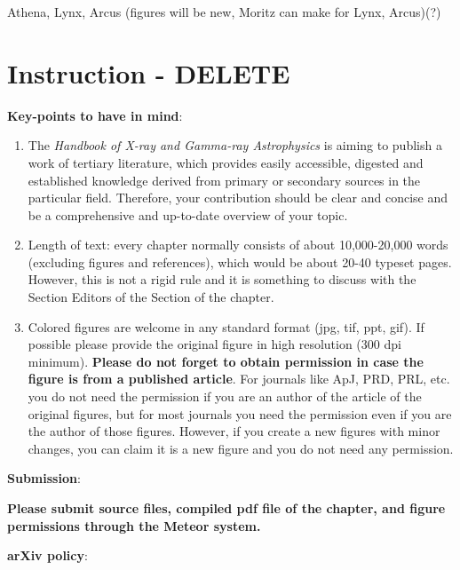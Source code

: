 \documentclass[graybox, nosecnum]{svmult}
\begin{document}
Athena, Lynx, Arcus (figures will be new, Moritz can make for Lynx, Arcus)(?)



\section{Instruction - DELETE}

\vspace{0.3cm}

{\bf Key-points to have in mind}:
\begin{enumerate}
\item The {\it Handbook of X-ray and Gamma-ray Astrophysics} is aiming to publish a work of tertiary literature, which provides easily accessible, digested and established knowledge derived from primary or secondary sources in the particular field. Therefore, your contribution should be clear and concise and be a comprehensive and up-to-date overview of your topic.
\item Length of text: every chapter normally consists of about 10,000-20,000 words (excluding figures and references), which would be about 20-40 typeset pages. However, this is not a rigid rule and it is something to discuss with the Section Editors of the Section of the chapter.
\item Colored figures are welcome in any standard format (jpg, tif, ppt, gif). If possible please provide the original figure in high resolution (300 dpi minimum). {\color{red}\bf Please do not forget to obtain permission in case the figure is from a published article}. For journals like ApJ, PRD, PRL, etc. you do not need the permission if you are an author of the article of the original figures, but for most journals you need the permission even if you are the author of those figures. However, if you create a new figures with minor changes, you can claim it is a new figure and you do not need any permission.
\end{enumerate}


\vspace{0.5cm}

{\bf Submission}:

\vspace{0.1cm}

{\color{red} \bf Please submit source files, compiled pdf file of the chapter, and figure permissions through the Meteor system.}

\vspace{0.5cm}

{\bf arXiv policy}:
\end{document}
